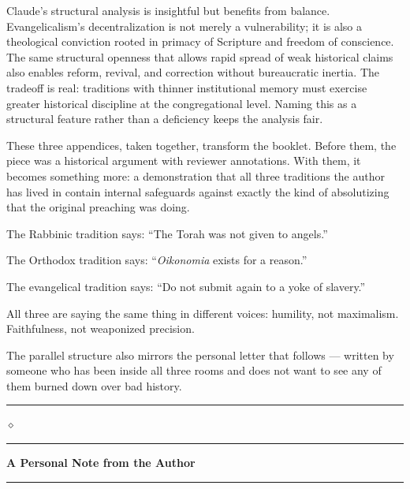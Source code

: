 \documentclass[10pt,twoside,openany]{book}
\newcommand{\ornrule}{%
  \par\bigskip
  {\noindent\hfil{\color{gold}\rule[0.5ex]{1.5in}{0.5pt}%
  \quad$\diamond$\quad%
  \rule[0.5ex]{1.5in}{0.5pt}}\hfil\par}%
  \bigskip
}
\begin{document}
\begin{gptbox}
Claude's structural analysis is insightful but benefits
from balance. Evangelicalism's decentralization is not
merely a vulnerability; it is also a theological
conviction rooted in primacy of Scripture and freedom
of conscience. The same structural openness that allows
rapid spread of weak historical claims also enables
reform, revival, and correction without bureaucratic
inertia. The tradeoff is real: traditions with thinner
institutional memory must exercise greater historical
discipline at the congregational level. Naming this as
a structural feature rather than a deficiency keeps the
analysis fair.
\end{gptbox}

\begin{reviewerfinalbox}
These three appendices, taken together, transform the
booklet. Before them, the piece was a historical
argument with reviewer annotations. With them, it
becomes something more: a demonstration that all three
traditions the author has lived in contain internal
safeguards against exactly the kind of absolutizing
that the original preaching was doing.

The Rabbinic tradition says: ``The Torah was not given
to angels.''

The Orthodox tradition says: ``\emph{Oikonomia} exists for a
reason.''

The evangelical tradition says: ``Do not submit again
to a yoke of slavery.''

All three are saying the same thing in different
voices: humility, not maximalism. Faithfulness, not
weaponized precision.

The parallel structure also mirrors the personal letter
that follows --- written by someone who has been inside
all three rooms and does not want to see any of them
burned down over bad history.
\end{reviewerfinalbox}

\ornrule



\clearpage
\thispagestyle{empty}
\vspace*{24pt}

\begin{center}
{\Large\bfseries\color{deepblue} A Personal Note from the Author}

\medskip

{\color{gold}\rule{2in}{0.5pt}}
\end{center}
\end{document}
